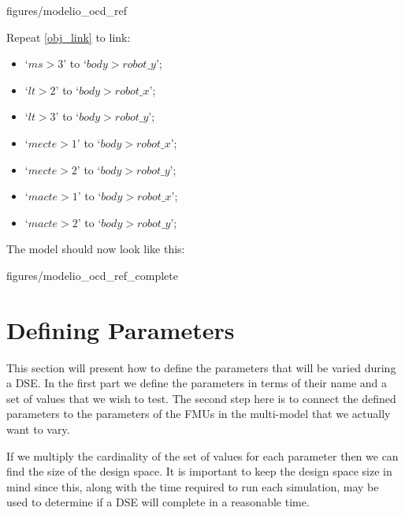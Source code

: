 \documentclass[11pt,a4paper]{../tutorial}
\begin{document}
\begin{instructions}
\begin{center}
\begin{annotation}[width=0.7\linewidth]{figures/modelio_ocd_ref}
    \end{annotation}
\end{center}

\newpage

\item Repeat \ref{obj_link} to link:
\begin{itemize}
	\item `$ms > 3$' to `$body > robot\_y$';
	\item `$lt > 2$' to `$body > robot\_x$';
	\item `$lt > 3$' to `$body > robot\_y$';
	\item `$mecte > 1$' to `$body > robot\_x$';
	\item `$mecte > 2$' to `$body > robot\_y$';
	\item `$macte > 1$' to `$body > robot\_x$';
	\item `$macte > 2$' to `$body > robot\_y$';
\end{itemize}

The model should now look like this:

\begin{center}
\begin{annotation}[width=0.9\linewidth]{figures/modelio_ocd_ref_complete}
    \end{annotation}
\end{center}

\end{instructions}


\newpage
\section{Defining Parameters}

This section will present how to define the parameters that will be varied during a DSE.  In the first part we define the parameters in terms of their name and a set of values that we wish to test. The second step here is to connect the defined parameters to the parameters of the FMUs in the multi-model that we actually want to vary.

If we multiply the cardinality of the set of values for each parameter then we can find the size of the design space.  It is important to keep the design space size in mind since this, along with the time required to run each simulation, may be used to determine if a DSE will complete in a reasonable time.
\end{document}
